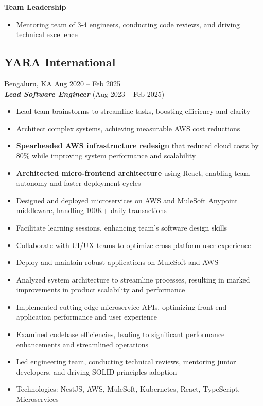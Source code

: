 \documentclass[10pt,a4paper]{article}
\begin{document}
\textbf{Team Leadership}
\begin{itemize}[leftmargin=*, nosep]
  \item Mentoring team of 3-4 engineers, conducting code reviews, and driving technical excellence
\end{itemize}

\subsection*{\large YARA International}
\textcolor{datecolor}{Bengaluru, KA \textbar Aug 2020 -- Feb 2025} \\
\textbf{\textit{Lead Software Engineer}} (Aug 2023 -- Feb 2025)

\begin{itemize}[leftmargin=*, nosep]
  \item Lead team brainstorms to streamline tasks, boosting efficiency and clarity
  \item Architect complex systems, achieving measurable AWS cost reductions
  \item \textbf{Spearheaded AWS infrastructure redesign} that reduced cloud costs by 80\% while improving system performance and scalability
  \item \textbf{Architected micro-frontend architecture} using React, enabling team autonomy and faster deployment cycles
  \item Designed and deployed microservices on AWS and MuleSoft Anypoint middleware, handling 100K+ daily transactions
  \item Facilitate learning sessions, enhancing team's software design skills
  \item Collaborate with UI/UX teams to optimize cross-platform user experience
  \item Deploy and maintain robust applications on MuleSoft and AWS
  \item Analyzed system architecture to streamline processes, resulting in marked improvements in product scalability and performance
  \item Implemented cutting-edge microservice APIs, optimizing front-end application performance and user experience
  \item Examined codebase efficiencies, leading to significant performance enhancements and streamlined operations
  \item Led engineering team, conducting technical reviews, mentoring junior developers, and driving SOLID principles adoption
  \item Technologies: NestJS, AWS, MuleSoft, Kubernetes, React, TypeScript, Microservices
\end{itemize}
\end{document}
